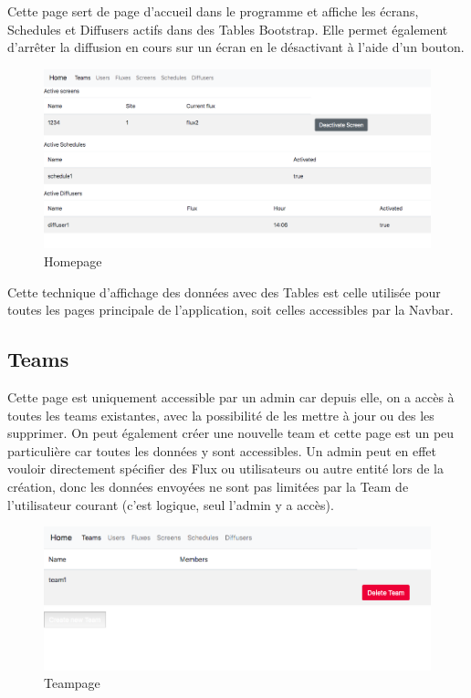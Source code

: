 \documentclass[french]{article}
\begin{document}
Cette page sert de page d'accueil dans le programme et affiche les écrans, Schedules et Diffusers actifs dans des Tables Bootstrap. Elle permet également d'arrêter la diffusion en cours sur un écran en le désactivant à l'aide d'un bouton.

\begin{figure}[h]
	\centering	
	\includegraphics[width=0.8\linewidth]{interface/homepage.png}%
	\caption{Homepage}
\end{figure}

Cette technique d'affichage des données avec des Tables est celle utilisée pour toutes les pages principale de l'application, soit celles accessibles par la Navbar.

\subsection{Teams}

Cette page est uniquement accessible par un admin car depuis elle, on a accès à toutes les teams existantes, avec la possibilité de les mettre à jour ou des les supprimer. On peut également  créer une nouvelle team et cette page est un peu particulière car toutes les données y sont accessibles. Un admin peut en effet vouloir directement spécifier des Flux ou utilisateurs ou autre entité lors de la création, donc les données envoyées ne sont pas limitées par la Team de l'utilisateur courant (c'est logique, seul l'admin y a accès). 

\begin{figure}[h]
	\centering	
	\includegraphics[width=0.8\linewidth]{interface/teampage.png}%
	\caption{Teampage}
\end{figure} 
\end{document}
